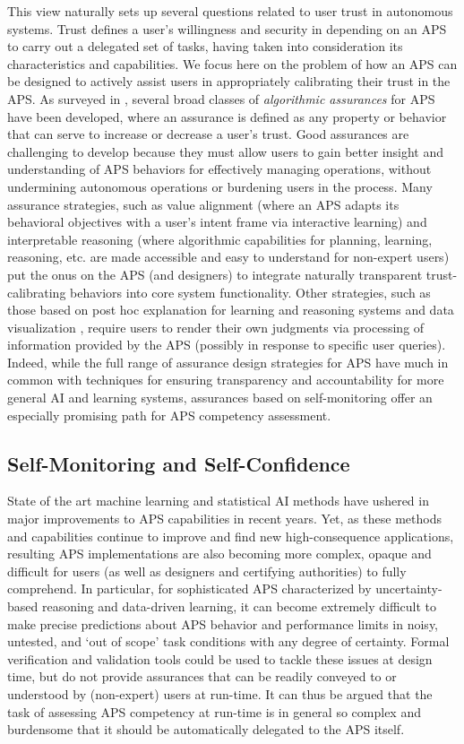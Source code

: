 This view naturally sets up several questions related to user trust in autonomous systems. Trust defines a user's willingness and security in depending on an APS to carry out a delegated set of tasks, having taken into consideration its characteristics and capabilities. 
We focus here on the problem of how an APS can be designed to actively assist users in appropriately calibrating their trust in the APS. As surveyed in \cite{Israelsen2018-es}, several broad classes of \emph{algorithmic assurances} for APS have been developed, where an assurance is defined as any property or behavior that can serve to increase or decrease a user's trust. 
Good assurances are challenging to develop because they must allow users to gain better insight and understanding of APS behaviors for effectively managing operations, without undermining autonomous operations or burdening users in the process. 
Many assurance strategies, such as value alignment \cite{Dragan2014-gu} (where an APS adapts its behavioral objectives with a user's intent frame via interactive learning) and interpretable reasoning \cite{Ruping2006-xj} (where algorithmic capabilities for planning, learning, reasoning, etc. are made accessible and easy to understand for non-expert users) put the onus on the APS (and designers) to integrate naturally transparent trust-calibrating behaviors into core system functionality. 
Other strategies, such as those based on post hoc explanation for learning and reasoning systems \cite{Lacave2004-gq, Ribeiro2016-uc} and data visualization \cite{Sacha2017-hf}, require users to render their own judgments via processing of information provided by the APS (possibly in response to specific user queries). 
Indeed, while the full range of assurance design strategies for APS have much in common with techniques for ensuring transparency and accountability for more general AI and learning systems, assurances based on self-monitoring offer an especially promising path for APS competency assessment. 

\subsection{Self-Monitoring and Self-Confidence}
State of the art machine learning and statistical AI methods have ushered in major improvements to APS capabilities in recent years. 
Yet, as these methods and capabilities continue to improve and find new high-consequence applications, resulting APS implementations are also becoming more complex, opaque and difficult for users (as well as designers and certifying authorities) to fully comprehend. 
In particular, for sophisticated APS characterized by uncertainty-based reasoning and data-driven learning, it can become extremely difficult to make precise predictions about APS behavior and performance limits in noisy, untested, and `out of scope' task conditions with any degree of certainty. Formal verification and validation tools could be used to tackle these issues at design time, but do not provide assurances that can be readily conveyed to or understood by (non-expert) users at run-time. 
It can thus be argued that the task of assessing APS competency at run-time is in general so complex and burdensome that it should be automatically delegated to the APS itself. 

